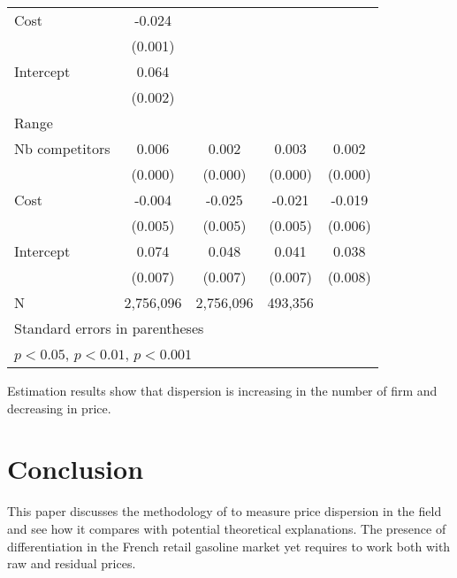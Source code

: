 \documentclass[english]{article}
\begin{document}
{{\begin{table}[h]
\begin{tabular}{lcccc}
Cost                     & -0.024\sym{***}  &        \sym{}    &       \sym{}     &\\
{}                       & (0.001)          &                  &                  &\\
Intercept                &  0.064\sym{***}  &        \sym{}    &       \sym{}     &\\
{}                       & (0.002)          &                  &                  &\\
\hline
Range & & & & \\
\hline
Nb competitors           &  0.006\sym{***}  &  0.002\sym{***}  &  0.003\sym{***}  &  0.002\sym{***} \\
{}                       & (0.000)          & (0.000)          & (0.000)          & (0.000)         \\
Cost                     & -0.004\sym{}     & -0.025\sym{***}  & -0.021\sym{***}  & -0.019\sym{***} \\
{}                       & (0.005)          & (0.005)          & (0.005)          & (0.006)         \\
Intercept                &  0.074\sym{***}  & 0.048\sym{***}   &  0.041\sym{***}  &  0.038\sym{***} \\
{}                       & (0.007)          & (0.007)          & (0.007)          & (0.008)         \\
\hline
N                        & 2,756,096        & 2,756,096        & 493,356          &\\
\hline\hline
\multicolumn{4}{l}{\footnotesize Standard errors in parentheses}\\
\multicolumn{4}{l}{\footnotesize \sym{*} \(p<0.05\), \sym{**} \(p<0.01\), \sym{***} \(p<0.001\)}\\
\end{tabular}
\end{table}

Estimation results show that dispersion is increasing in the number of firm and decreasing in price.

\section{Conclusion}

This paper discusses the methodology of \cite{TAP11} to measure price dispersion in the field and see how it compares with potential theoretical explanations. The presence of differentiation in the French retail gasoline market yet requires to work both with raw and residual prices.

}}
\end{document}
